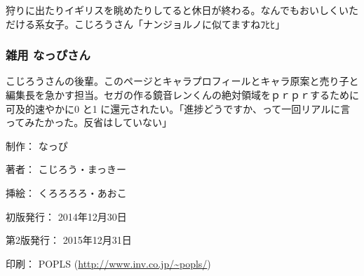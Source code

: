 \documentclass[9pt,b5paper,tombo,openany]{jsbook}
\begin{document}
\begin{flushleft}
\begin{minipage}{0.5\hsize}
\begin{scriptsize}
狩りに出たりイギリスを眺めたりしてると休日が終わる。なんでもおいしくいただける系女子。こじろうさん「ナンジョルノに似てますねﾌﾋﾋ」

\subsubsection*{雑用 なっぴさん}

こじろうさんの後輩。このページとキャラプロフィールとキャラ原案と売り子と編集長を急かす担当。セガの作る鏡音レンくんの絶対領域をｐｒｐｒするために可及的速やかに0 と1 に還元されたい。「進捗どうですか、って一回リアルに言ってみたかった。反省はしていない」

\end{scriptsize}
\end{minipage}
\end{flushleft}

\begin{flushright}
\begin{minipage}{0.5\hsize}
\begin{small}
\begin{description}
  \item{制作：} なっぴ
  \item{著者：} こじろう・まっきー
  \item{挿絵：} くろろろろ・あおこ
  \item{初版発行：} 2014年12月30日
  \item{第2版発行：} 2015年12月31日
  \item{印刷：} POPLS (\url{http://www.inv.co.jp/~popls/})
\end{description}
\end{small}
\end{minipage}
\end{flushright}

\newpage
\end{document}

